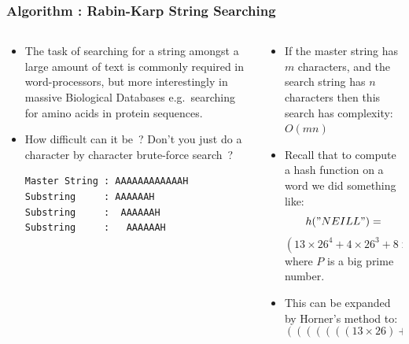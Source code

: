 \begin{frame}[fragile]
\frametitle{Algorithm : Rabin-Karp String Searching}
\begin{columns}[T]

\begin{column}{0.40\textwidth}
\begin{itemize}[<+->]
\item The task of searching for a string amongst a large
amount of text is commonly required in word-processors,
but more interestingly in massive Biological Databases e.g.\ searching for amino acids in protein sequences.
\item How difficult can it be~? Don't you just do a character by
character brute-force search~?
\begin{verbatim}
Master String : AAAAAAAAAAAAH
Substring     : AAAAAAH
Substring     :  AAAAAAH
Substring     :   AAAAAAH
\end{verbatim}
\end{itemize}
\end{column}

\pause
\begin{column}{0.50\textwidth}
\begin{itemize}[<+->]
\item If the master string has $m$ characters, and the search string has $n$ characters then this search has complexity: $O(mn)$
\item Recall that to compute a hash function on a word we did something like:
\[
h("NEILL") =
\]
{\scriptsize
\[
(13\times26^4 + 4\times26^3 + 8\times26^2 + 11\times26 + 11) \% P
\]
}
where $P$ is a big prime number.
\item This can be expanded by Horner's method to:
{\scriptsize
\[
(((((((13\times26)+ 4)\times26) + 8)\times26) + 11)\times26 + 11) \% P
\]
}
\end{itemize}
\end{column}

\end{columns}
\end{frame}



